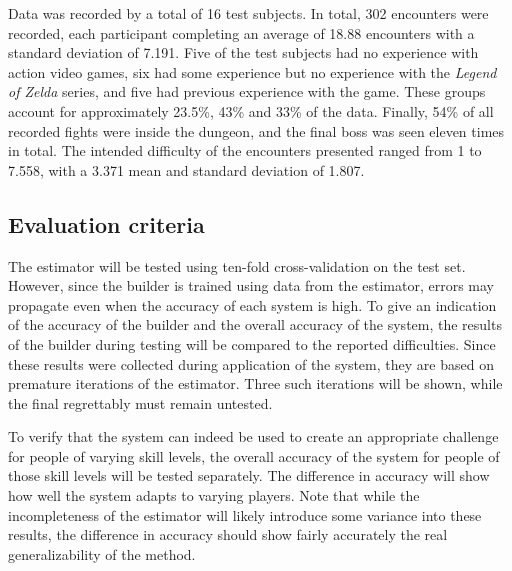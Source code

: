 \documentclass[a4paper]{article}
\begin{document}
\begin{multicols*}{2}
Data was recorded by a total of 16 test subjects. In total, 302 encounters were recorded, each participant completing an average of 18.88 encounters with a standard deviation of 7.191. Five of the test subjects had no experience with action video games, six had some experience but no experience with the \emph{Legend of Zelda} series, and five had previous experience with the game. These groups account for approximately 23.5\%, 43\% and 33\% of the data. Finally, 54\% of all recorded fights were inside the dungeon, and the final boss was seen eleven times in total. The intended difficulty of the encounters presented ranged from 1 to 7.558, with a 3.371 mean and standard deviation of 1.807.

\subsection{Evaluation criteria}
The estimator will be tested using ten-fold cross-validation on the test set. However, since the builder is trained using data from the estimator, errors may propagate even when the accuracy of each system is high. To give an indication of the accuracy of the builder and the overall accuracy of the system, the results of the builder during testing will be compared to the reported difficulties. Since these results were collected during application of the system, they are based on premature iterations of the estimator. Three such iterations will be shown, while the final regrettably must remain untested.

To verify that the system can indeed be used to create an appropriate challenge for people of varying skill levels, the overall accuracy of the system for people of those skill levels will be tested separately. The difference in accuracy will show how well the system adapts to varying players. Note that while the incompleteness of the estimator will likely introduce some variance into these results, the difference in accuracy should show fairly accurately the real generalizability of the method.


\end{multicols*}
\end{document}
